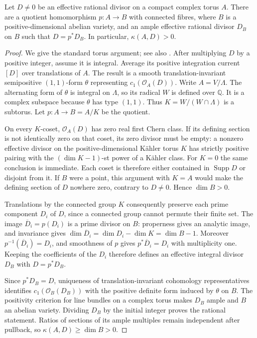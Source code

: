 \begin{lemma}\label{lem:torus-divisor}
Let \(D\ne0\) be an effective rational divisor on a compact complex
torus \(A\). There are a quotient homomorphism \(p:A\to B\) with
connected fibres, where \(B\) is a positive-dimensional abelian
variety, and an ample effective rational divisor \(D_B\) on \(B\)
such that \(D=p^*D_B\). In particular, \(\kappa(A,D)>0\).
\end{lemma}
\begin{proof}
We give the standard torus argument; see also \cite{Debarre1999}.
After multiplying \(D\) by a positive integer, assume it is integral.
Average its positive integration current \([D]\) over translations of
\(A\). The result is a smooth translation-invariant semipositive
\((1,1)\)-form \(\theta\) representing
\(c_1(\mathcal O_A(D))\). Write \(A=V/\Lambda\). The alternating
form of \(\theta\) is integral on \(\Lambda\), so its radical \(W\)
is defined over \(\mathbb Q\). It is a complex subspace because
\(\theta\) has type \((1,1)\). Thus
\(K=W/(W\cap\Lambda)\) is a subtorus. Let \(p:A\to B=A/K\) be
the quotient.

On every \(K\)-coset, \(\mathcal O_A(D)\) has zero real first Chern
class. If its defining section is not identically zero on that
coset, its zero divisor must be empty: a nonzero effective divisor
on the positive-dimensional K\"ahler torus \(K\) has strictly
positive pairing with the \((\dim K-1)\)-st power of a K\"ahler class.
For \(K=0\) the same conclusion is immediate. Each coset is
therefore either contained in \(\operatorname{Supp}D\) or disjoint
from it. If \(B\) were a point, this argument with \(K=A\) would
make the defining section of \(D\) nowhere zero, contrary to
\(D\ne0\). Hence \(\dim B>0\).

Translations by the connected group \(K\) consequently preserve
each prime component \(D_i\) of \(D\), since a connected group
cannot permute their finite set.
The image \(\overline D_i=p(D_i)\) is a prime divisor on \(B\):
properness gives an analytic image, and invariance gives
\(\dim\overline D_i=\dim D_i-\dim K=\dim B-1\).
Moreover \(p^{-1}(\overline D_i)=D_i\), and smoothness of \(p\)
gives \(p^*\overline D_i=D_i\) with multiplicity one. Keeping the
coefficients of the \(D_i\) therefore defines an effective integral
divisor \(D_B\) with \(D=p^*D_B\).

Since \(p^*D_B=D\), uniqueness of translation-invariant cohomology
representatives identifies \(c_1(\mathcal O_B(D_B))\) with the
positive definite form induced by \(\theta\) on \(B\). The positivity
criterion for line bundles on a complex torus makes \(D_B\) ample
and \(B\) an abelian variety. Dividing \(D_B\) by the initial integer
proves the rational statement. Ratios of
sections of its ample multiples remain independent after pullback,
so \(\kappa(A,D)\ge\dim B>0\).
\end{proof}

